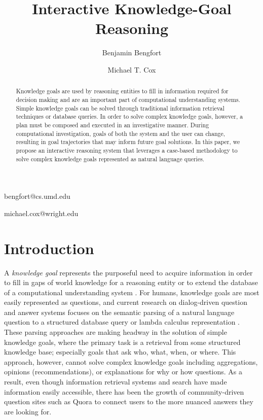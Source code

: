 \documentclass[11pt,letterpaper]{article}
\begin{document}
\title{Interactive Knowledge-Goal Reasoning}

\author{Benjamin Bengfort}{bengfort@cs.umd.edu}
\address{Department of Computer Science, University of Maryland,
         College Park, MD 20742 USA}
\author{Michael T. Cox}{michael.cox@wright.edu}
\address{Wright State Research Institute, Wright State University,
         Dayton, OH 45435 USA}
\vskip 0.2in


\begin{abstract}
Knowledge goals are used by reasoning entities to fill in information required for decision making and are an important part of computational understanding systems. Simple knowledge goals can be solved through traditional information retrieval techniques or database queries. In order to solve complex knowledge goals, however, a plan must be composed and executed in an investigative manner. During computational investigation, goals of both the system and the user can change, resulting in goal trajectories that may inform future goal solutions. In this paper, we propose an interactive reasoning system that leverages a case-based methodology to solve complex knowledge goals represented as natural language queries.
\end{abstract}

\section{Introduction}

A \textit{knowledge goal} represents the purposeful need to acquire information in order to fill in gaps of world knowledge for a reasoning entity or to extend the database of a computational understanding system \cite{ram_goal-based_1991}. For humans, knowledge goals are most easily represented as questions, and current research on dialog-driven question and answer systems focuses on the semantic parsing of a natural language question to a structured database query \cite{yahya_natural_2012} or lambda calculus representation \cite{berant_semantic_2013}. These parsing approaches are making headway in the solution of simple knowledge goals, where the primary task is a retrieval from some structured knowledge base; especially goals that ask who, what, when, or where. This approach, however, cannot solve complex knowledge goals including aggregations, opinions (recommendations), or explanations for why or how questions. As a result, even though information retrieval systems and search have made information easily accessible, there has been the growth of community-driven question sites such as Quora \cite{wang_wisdom_2013} to connect users to the more nuanced answers they are looking for.
\end{document}

